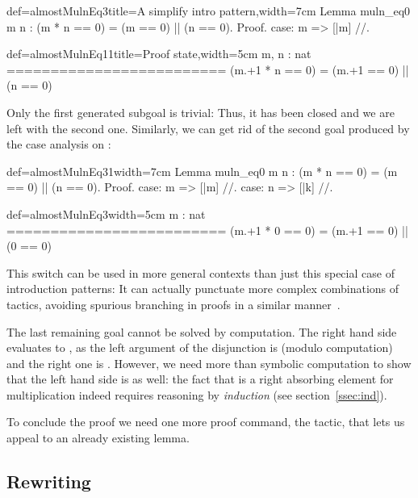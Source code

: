 \begin{coq}{def=almostMulnEq3}{title=A simplify intro pattern,width=7cm}
Lemma muln_eq0 m n :
  (m * n == 0) = (m == 0) || (n == 0).
Proof.
case: m => [|m] //.
\end{coq}
\begin{coqout}{def=almostMulnEq11}{title=Proof state,width=5cm}
m, n : nat
=========================
(m.+1 * n == 0) =
  (m.+1 == 0) || (n == 0)
\end{coqout}

Only the first generated subgoal is trivial: Thus, it has been closed
and we are left with the second one. Similarly, we can get rid of the
second goal produced by the case analysis on :

\begin{coq}{def=almostMulnEq31}{width=7cm}
Lemma muln_eq0 m n :
  (m * n == 0) = (m == 0) || (n == 0).
Proof.
case: m => [|m] //.
case: n => [|k] //.
\end{coq}
\begin{coqout}{def=almostMulnEq3}{width=5cm}
m : nat
=========================
(m.+1 * 0 == 0) =
  (m.+1 == 0) || (0 == 0)
\end{coqout}

This \C{//} switch can be used in
more general contexts than just this special case of introduction patterns:
It can actually punctuate more complex combinations of tactics,
avoiding spurious branching in proofs in a similar
manner~\cite[section 5.4]{ssrman}.

The last remaining goal cannot be solved by computation.
The right hand side evaluates to
, as the left argument of the disjunction is  (modulo
computation) and the right one is . However, we need
more than symbolic computation to show that the left hand side is
 as well: the fact that  is a right absorbing element for
multiplication indeed requires reasoning by \emph{induction}
(see section~\ref{ssec:ind}).

To conclude the proof we need one more proof command, the
 tactic, that lets us appeal to an already existing lemma.


\subsection{Rewriting}\label{ssec:rw}

